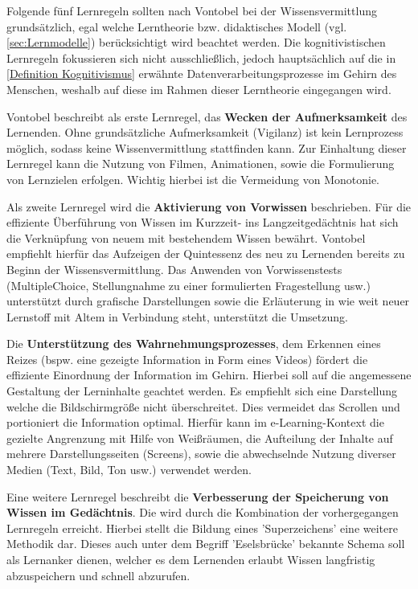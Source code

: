 Folgende fünf Lernregeln sollten nach Vontobel bei der Wissensvermittlung grundsätzlich, egal welche Lerntheorie bzw. didaktisches Modell (vgl. \ref{sec:Lernmodelle}) berücksichtigt wird beachtet werden. Die kognitivistischen Lernregeln fokussieren sich nicht ausschließlich, jedoch hauptsächlich auf die in \ref{Definition Kognitivismus} erwähnte Datenverarbeitungsprozesse im Gehirn des Menschen, weshalb auf diese im Rahmen dieser Lerntheorie eingegangen wird.\cite[S. 10]{Vontobel.2006}

Vontobel beschreibt als erste Lernregel, das \textbf{Wecken der Aufmerksamkeit} des Lernenden. Ohne grundsätzliche Aufmerksamkeit (Vigilanz) ist kein Lernprozess möglich, sodass keine Wissenvermittlung stattfinden kann. Zur Einhaltung dieser Lernregel kann die Nutzung von Filmen, Animationen, sowie die Formulierung von Lernzielen erfolgen. Wichtig hierbei ist die Vermeidung von Monotonie. \cite[S. 10f.]{Vontobel.2006}

Als zweite Lernregel wird die \textbf{Aktivierung von Vorwissen} beschrieben. Für die effiziente Überführung von Wissen im Kurzzeit- ins Langzeitgedächtnis hat sich die Verknüpfung von neuem mit bestehendem Wissen bewährt. Vontobel empfiehlt hierfür das Aufzeigen der Quintessenz des neu zu Lernenden bereits zu Beginn der Wissensvermittlung. Das Anwenden von Vorwissenstests (MultipleChoice, Stellungnahme zu einer formulierten Fragestellung usw.) unterstützt durch grafische Darstellungen sowie die Erläuterung in wie weit neuer Lernstoff mit Altem in Verbindung steht, unterstützt die Umsetzung. \cite[S. 11f.]{Vontobel.2006}

Die \textbf{Unterstützung des Wahrnehmungsprozesses}, dem Erkennen eines Reizes (bspw. eine gezeigte Information in Form eines Videos) fördert die effiziente Einordnung der Information im Gehirn. Hierbei soll auf die angemessene Gestaltung der Lerninhalte geachtet werden. Es empfiehlt sich eine Darstellung welche die Bildschirmgröße nicht überschreitet. Dies vermeidet das Scrollen und portioniert die Information optimal. Hierfür kann im e-Learning-Kontext die gezielte Angrenzung mit Hilfe von Weißräumen, die Aufteilung der Inhalte auf mehrere Darstellungsseiten (Screens), sowie die abwechselnde Nutzung diverser Medien (Text, Bild, Ton usw.) verwendet werden.\cite[S. 12f.]{Vontobel.2006}

Eine weitere Lernregel beschreibt die \textbf{Verbesserung der Speicherung von Wissen im Gedächtnis}. Die wird durch die Kombination der vorhergegangen Lernregeln erreicht. Hierbei stellt die Bildung eines 'Superzeichens' eine weitere Methodik dar. Dieses auch unter dem Begriff 'Eselsbrücke' bekannte Schema soll als Lernanker dienen, welcher es dem Lernenden erlaubt Wissen langfristig abzuspeichern und schnell abzurufen. \cite[S.14]{Vontobel.2006}   
        
